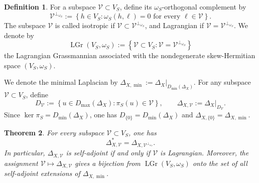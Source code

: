 \documentclass[12pt]{amsart}
\theoremstyle{plain}
\newtheorem{thm}{Theorem}[section]
\theoremstyle{definition}
\newtheorem{defn}[thm]{Definition}
\theoremstyle{remark}
\numberwithin{equation}{section} \numberwithin{figure}{section}
\begin{document}
\begin{defn}\label{def:Lagrangian-Grassmannian}
For a subspace \(\mathcal V\subset V_S\), define its
\(\omega_S\)-orthogonal complement by
\[
\mathcal V^{\perp_{\omega_S}}
:=
\left\{
h\in V_S:
\omega_S(h,\ell)=0
\text{ for every }\ell\in\mathcal V
\right\}.
\]
The subspace \(\mathcal V\) is called isotropic if
\(\mathcal V\subset\mathcal V^{\perp_{\omega_S}}\), and Lagrangian if
\(\mathcal V=\mathcal V^{\perp_{\omega_S}}\). We denote by
\[
\operatorname{LGr}(V_S,\omega_S)
:=
\left\{
\mathcal V\subset V_S:
\mathcal V=\mathcal V^{\perp_{\omega_S}}
\right\}
\]
the Lagrangian Grassmannian associated with the nondegenerate
skew-Hermitian space \((V_S,\omega_S)\).
\end{defn}

We denote the minimal Laplacian by
\(
    \Delta_{X,\min}
    :=
    \Delta_X\big|_{D_{\min}(\Delta_X)}.
\)
For any subspace \(\mathcal V\subset V_S\), define
\[
    D_{\mathcal V}
    :=
    \left\{
        u\in D_{\max}(\Delta_X):
        \pi_S(u)\in\mathcal V
    \right\},
    \qquad
    \Delta_{X,\mathcal V}
    :=
    \Delta_X\big|_{D_{\mathcal V}}.
\]
Since \(\ker\pi_S=D_{\min}(\Delta_X)\), one has
\(D_{\{0\}}=D_{\min}(\Delta_X)\) and
\(\Delta_{X,\{0\}}=\Delta_{X,\min}\).


\begin{thm}\label{thm:self-adjoint-extensions}
For every subspace \(\mathcal V\subset V_S\), one has
\[
    \Delta_{X,\mathcal V}^{*}
    =
    \Delta_{X,\mathcal V^{\perp_{\omega_S}}}.
\]
In particular, \(\Delta_{X,\mathcal V}\) is self-adjoint if and only
if \(\mathcal V\) is Lagrangian. Moreover, the assignment
\(\mathcal V\mapsto\Delta_{X,\mathcal V}\) gives a bijection from
\(\operatorname{LGr}(V_S,\omega_S)\) onto the set of all
self-adjoint extensions of \(\Delta_{X,\min}\).
\end{thm}
\end{document}
